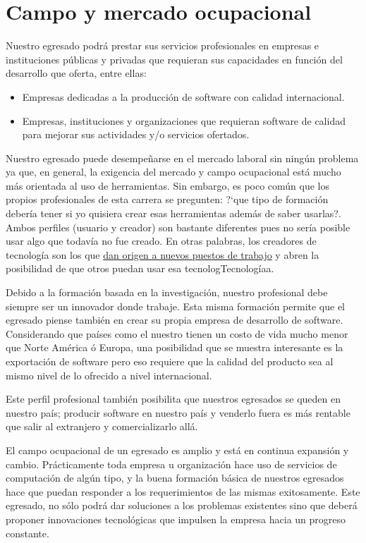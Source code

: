 \section{Campo y mercado ocupacional}\label{sec:campo-ocupacional}
Nuestro egresado podrá prestar sus servicios profesionales en empresas e instituciones públicas y privadas que requieran sus capacidades en función del desarrollo que oferta, entre ellas:

\begin{itemize}
\item Empresas dedicadas a la producción de software con calidad internacional.
\item Empresas, instituciones y organizaciones que requieran software de calidad para mejorar sus actividades y/o servicios ofertados.
\end{itemize}

Nuestro egresado puede desempeñarse en el mercado laboral sin ningún problema ya que, en general, la exigencia del mercado y campo ocupacional está mucho más orientada al uso de herramientas. Sin embargo, es poco común que los propios profesionales de esta carrera se pregunten: ?`que tipo de formación debería tener si yo quisiera crear esas herramientas además de saber usarlas?. Ambos perfiles (usuario y creador) son bastante diferentes pues no sería posible usar algo que todavía no fue creado. En otras palabras, los creadores de tecnología son los que \underline{dan origen a nuevos puestos de trabajo} y abren la posibilidad de que otros puedan usar esa tecnologTecnologíaa.

Debido a la formación basada en la investigación, nuestro profesional debe siempre ser un innovador donde trabaje. Esta misma formación permite que el egresado piense también en crear su propia empresa de desarrollo de software. Considerando que países como el nuestro tienen un costo de vida mucho menor que Norte América ó Europa, una posibilidad que se muestra interesante es la exportación de software pero eso requiere que la calidad del producto sea al mismo nivel de lo ofrecido a nivel internacional.

Este perfil profesional también posibilita que nuestros egresados se queden en nuestro país; producir software en nuestro país y venderlo fuera es más rentable que salir al extranjero y comercializarlo allá.

El campo ocupacional de un egresado es amplio y está en continua expansión y cambio. Prácticamente toda empresa u organización hace uso de servicios de computación de algún tipo, y la buena formación básica de nuestros egresados hace que puedan responder a los requerimientos de las mismas exitosamente. Este egresado, no sólo podrá dar soluciones a los problemas existentes sino que deberá proponer innovaciones tecnológicas que impulsen la empresa hacia un progreso constante.

